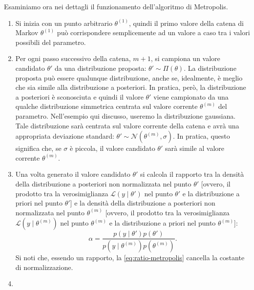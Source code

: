 \documentclass[
  10pt,
  italian,
  a4paper,
  extrafontsizes,onecolumn,openright
  ]{memoir}
\begin{document}
Esaminiamo ora nei dettagli il funzionamento dell'algoritmo di Metropolis.

\begin{enumerate}
\def\labelenumi{(\alph{enumi})}
\item
  Si inizia con un punto arbitrario \(\theta^{(1)}\), quindi il primo valore della catena di Markov \(\theta^{(1)}\) può corrispondere semplicemente ad un valore a caso tra i valori possibili del parametro.
\item
  Per ogni passo successivo della catena, \(m + 1\), si campiona un valore candidato \(\theta'\) da una distribuzione proposta: \(\theta' \sim \Pi(\theta)\). La distribuzione proposta può essere qualunque distribuzione, anche se, idealmente, è meglio che sia simile alla distribuzione a posteriori. In pratica, però, la distribuzione a posteriori è sconosciuta e quindi il valore \(\theta'\) viene campionato da una qualche distribuzione simmetrica centrata sul valore corrente \(\theta^{(m)}\) del parametro. Nell'esempio qui discusso, useremo la distribuzione gaussiana. Tale distribuzione sarà centrata sul valore corrente della catena e avrà una appropriata deviazione standard: \(\theta' \sim \mathcal{N}(\theta^{(m)}, \sigma)\). In pratica, questo significa che, se \(\sigma\) è piccola, il valore candidato \(\theta'\) sarà simile al valore corrente \(\theta^{(m)}\).
\item
  Una volta generato il valore candidato \(\theta'\) si calcola il rapporto tra la densità della distribuzione a posteriori non normalizzata nel punto \(\theta'\) {[}ovvero, il prodotto tra la verosimiglianza \(\mathcal{L}(y \mid \theta')\) nel punto \(\theta'\) e la distribuzione a priori nel punto \(\theta'\){]} e la densità della distribuzione a posteriori non normalizzata nel punto \(\theta^{(m)}\) {[}ovvero, il prodotto tra la verosimiglianza \(\mathcal{L}(y \mid \theta^{(m)})\) nel punto \(\theta^{(m)}\) e la distribuzione a priori nel punto \(\theta^{(m)}\){]}:
  \begin{equation}
  \alpha = \frac{p(y \mid \theta') p(\theta')}{p(y \mid \theta^{(m)}) p(\theta^{(m)})}.
  \label{eq:ratio-metropolis}
  \end{equation}
  \noindent
  Si noti che, essendo un rapporto, la \eqref{eq:ratio-metropolis} cancella la costante di normalizzazione.
\item

\end{enumerate}
\end{document}
